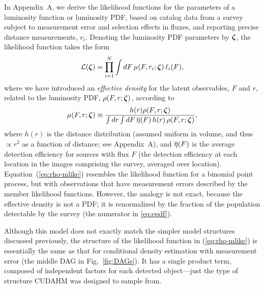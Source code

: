 In Appendix~A, we derive the likelihood functions for the parameters of a luminosity function or luminosity PDF, based on catalog data from a survey subject to measurement error and selection effects in fluxes, and reporting precise distance measurements, $r_i$.
Denoting the luminosity PDF parameters by $\boldsymbol{\zeta}$, the likelihood function takes the form
\begin{equation}\label{eq:rho-mlike}
\mathcal{L}(\boldsymbol{\zeta})
  = \prod_{i=1}^N \int dF\, \mu(F,r_i;\boldsymbol{\zeta})\, \ell_i(F),
\end{equation}
where we have introduced an \emph{effective density} for the latent observables, $F$ and $r$, related to the luminosity PDF, $\rho(F,r;\boldsymbol{\zeta})$, according to
\begin{equation}\label{eq:epdf}
\mu(F,r;\boldsymbol{\zeta}) \equiv
  \frac{h(r) \rho(F,r;\boldsymbol{\zeta})}
    {\int dr \int dF\,\overline{\eta}(F)\, h(r)\, \rho(F,r;\boldsymbol{\zeta})},
\end{equation}
where $h(r)$ is the distance distribution (assumed uniform in volume, and thus $\propto r^2$ as a function of distance; see Appendix~A), and $\overline{\eta}(F)$ is the average detection efficiency for sources with flux $F$ (the detection efficiency at each location in the images comprising the survey, averaged over location).
Equation~(\ref{eq:rho-mlike}) resembles the likelihood function for a binomial point process, but with observations that have measurement errors described by the member likelihood functions.
However, the analogy is not exact, because the effective density is not a PDF; it is renormalized by the fraction of the population detectable by the survey (the numerator in \eqref{eq:epdf}).

Although this model does not exactly match the simpler model structures discussed previously, the structure of the likelihood function in (\ref{eq:rho-mlike}) is essentially the same as that for conditional density estimation with measurement error (the middle DAG in Fig.~\ref{fig:DAGs}).
It has a single product term, composed of independent factors for each detected object---just the type of structure CUDAHM was designed to sample from.